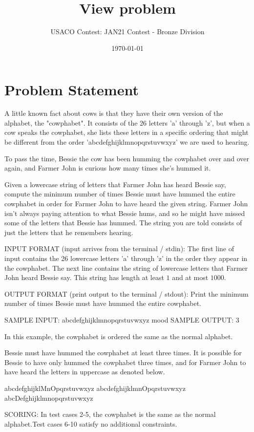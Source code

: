 \documentclass[12pt]{article}
\title{View problem}
\author{USACO Contest: JAN21 Contest - Bronze Division}
\date{\today}
\begin{document}
\maketitle

\section*{Problem Statement}

A little known fact about cows is that they have their own version of the
alphabet, the "cowphabet".  It consists of the 26 letters 'a' through 'z', but
when a cow speaks the cowphabet, she lists these letters in a specific ordering
that might be different from the order 'abcdefghijklmnopqrstuvwxyz' we are used to
hearing.

To pass the time, Bessie the cow has been humming the cowphabet over and  over
again, and Farmer John is curious how many times she's hummed it.

Given a lowercase string of letters that Farmer John has heard Bessie say,
compute the minimum number of times Bessie must have hummed the entire cowphabet
in order for Farmer John to have heard the given string. Farmer John isn't
always paying attention to what Bessie hums, and so he might have missed some of
the letters that Bessie has hummed.  The string you are told consists of just
the letters that he remembers hearing.

INPUT FORMAT (input arrives from the terminal / stdin):
The first line of input contains the 26 lowercase letters 'a' through 'z' in the
order they appear in the cowphabet.  The next line contains the string  of
lowercase letters that Farmer John heard Bessie say.  This string has length at
least $1$ and at most $1000$.

OUTPUT FORMAT (print output to the terminal / stdout):
Print the minimum number of times Bessie must have hummed the entire cowphabet.

SAMPLE INPUT:
abcdefghijklmnopqrstuvwxyz
mood
SAMPLE OUTPUT: 
3

In this example, the cowphabet is ordered the same as the normal alphabet.

Bessie must have hummed the cowphabet at least three times. It is possible for
Bessie to have only hummed the cowphabet three times, and for Farmer John to
have heard the letters in uppercase as denoted below.


abcdefghijklMnOpqrstuvwxyz
abcdefghijklmnOpqrstuvwxyz
abcDefghijklmnopqrstuvwxyz

SCORING:
In test cases 2-5, the cowphabet is the same as the normal alphabet.Test cases 6-10 satisfy no additional constraints.
\end{document}

